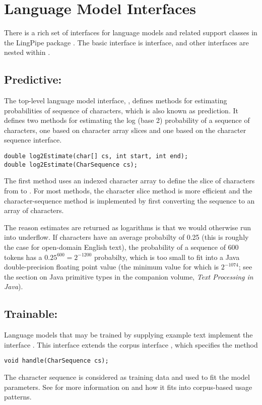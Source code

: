 \section{Language Model Interfaces}\label{section:char-lm-interfaces}

There is a rich set of interfaces for language models and related
support classes in the LingPipe package .  The
basic interface is  interface, and
other interfaces are nested within .

\subsection{Predictive: }

The top-level language model interface, , defines
methods for estimating probabilities of sequence of characters, which
is also known as prediction.  It defines two methods for estimating
the log (base 2) probability of a sequence of characters, one based on
character array slices and one based on the character sequence
interface.
%
\begin{verbatim}
double log2Estimate(char[] cs, int start, int end);
double log2Estimate(CharSequence cs);
\end{verbatim}
%
The first method uses an indexed character array to define the slice
of characters from  to .  For most
methods, the character slice method is more efficient and the
character-sequence method is implemented by first converting the
sequence to an array of characters.

The reason estimates are returned as logarithms is that we would
otherwise run into underflow.  If characters have an average
probabilty of 0.25 (this is roughly the case for open-domain English
text), the probability of a sequence of 600 tokens has a $0.25^{600} =
2^{-1200}$ probabilty, which is too small to fit into a Java
double-precision floating point value (the minimum value for which is
$2^{-1074}$; see the section on Java primitive types in the companion
volume, {\it Text Processing in Java}).

\subsection{Trainable: }

Language models that may be trained by supplying example text
implement the interface .  This interface
extends the corpus interface ,
which specifies the method
%
\begin{verbatim}
void handle(CharSequence cs);
\end{verbatim}
%
The character sequence is considered as training data and used to fit
the model parameters.  See  for more
information on  and how it fits into corpus-based
usage patterns.

